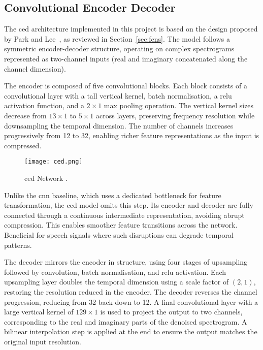 \subsection{Convolutional Encoder Decoder}
\label{sec:ced}

The \gls{ced} architecture implemented in this project is based on the design proposed by Park and Lee~\cite{park2017acoustic}, as reviewed in Section~\ref{sec:fcns}. The model follows a symmetric encoder-decoder structure, operating on complex spectrograms represented as two-channel inputs (real and imaginary concatenated along the channel dimension).

The encoder is composed of five convolutional blocks. Each block consists of a convolutional layer with a tall vertical kernel, batch normalisation, a \gls{relu} activation function, and a \(2 \times 1\) max pooling operation. The vertical kernel sizes decrease from \(13 \times 1\) to \(5 \times 1\) across layers, preserving frequency resolution while downsampling the temporal dimension. The number of channels increases progressively from 12 to 32, enabling richer feature representations as the input is compressed.

\begin{figure}[h]
    \centering
    \texttt{[image: ced.png]}
    \caption{\label{fig:ced}\gls{ced} Network \cite{park2017acoustic}.}
\end{figure}

Unlike the \gls{cnn} baseline, which uses a dedicated bottleneck for feature transformation, the \gls{ced} model omits this step. Its encoder and decoder are fully connected through a continuous intermediate representation, avoiding abrupt compression. This enables smoother feature transitions across the network. Beneficial for speech signals where such disruptions can degrade temporal patterns.

The decoder mirrors the encoder in structure, using four stages of upsampling followed by convolution, batch normalisation, and \gls{relu} activation. Each upsampling layer doubles the temporal dimension using a scale factor of \((2, 1)\), restoring the resolution reduced in the encoder. The decoder reverses the channel progression, reducing from 32 back down to 12. A final convolutional layer with a large vertical kernel of \(129 \times 1\) is used to project the output to two channels, corresponding to the real and imaginary parts of the denoised spectrogram. A bilinear interpolation step is applied at the end to ensure the output matches the original input resolution.

